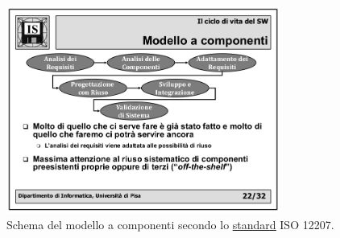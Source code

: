 			\begin{figure}[H]
				\centering
				\includegraphics[width=0.8\textwidth]{img/acomponenti}		
				\caption{Schema del modello a componenti secondo lo \underline{\hyperref[standard]{standard}} ISO 12207.}
			\end{figure} 
		
